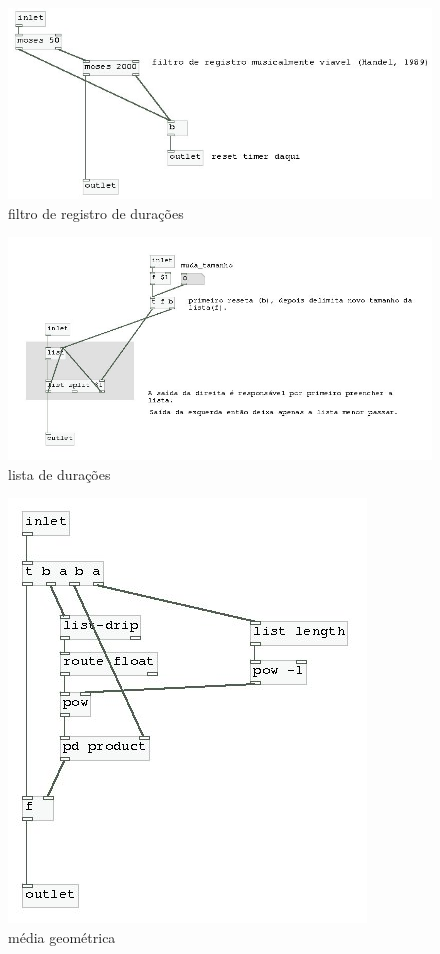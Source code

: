 \documentclass{ppgmus}
\begin{document}
\begin{figure}[!ht]
\includegraphics[scale=.5]{sinc-calc-ritmo1}
\caption{filtro de registro de durações}
\label{[sinc-calc-ritmo1]}
\end{figure}

\begin{figure}[!ht]
\includegraphics[scale=.5]{sinc-calc-ritmo2}
\caption{lista de durações}
\label{[sinc-calc-ritmo2]}
\end{figure}

\begin{figure}[!ht]
\includegraphics[scale=.5]{sinc-calc-ritmo3}
\caption{média geométrica}
\label{[sinc-calc-ritmo3]}
\end{figure}
\end{document}
